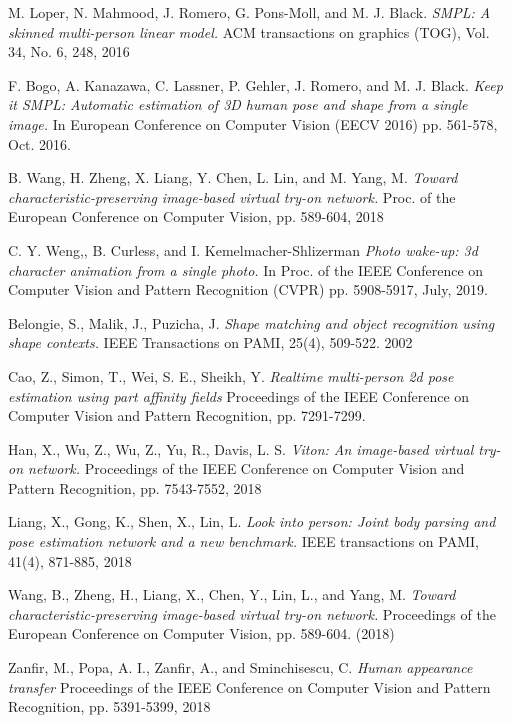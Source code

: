 \documentclass[runningheads]{llncs}
\begin{document}
   

\begin{thebibliography}{9}

M. Loper, N. Mahmood, J. Romero, G. Pons-Moll, and  M. J. Black.
\textit{SMPL: A skinned multi-person linear model.}
ACM transactions on graphics (TOG), Vol. 34, No. 6, 248, 2016

F. Bogo, A. Kanazawa, C. Lassner, P. Gehler, J. Romero, and M. J. Black.
\textit{Keep it SMPL: Automatic estimation of 3D human pose and shape from a single image.}
In European Conference on Computer Vision (EECV 2016) pp. 561-578, Oct. 2016.


B. Wang, H. Zheng, X. Liang, Y. Chen, L. Lin, and M. Yang, M.
\textit{Toward characteristic-preserving image-based virtual try-on network.}
Proc. of the European Conference on Computer Vision, pp. 589-604, 2018

C. Y. Weng,, B. Curless, and I. Kemelmacher-Shlizerman
\textit{Photo wake-up: 3d character animation from a single photo.}
In Proc. of the IEEE Conference on Computer Vision and Pattern Recognition (CVPR) pp. 5908-5917, July, 2019.


Belongie, S., Malik, J.,  Puzicha, J. 
\textit{Shape matching and object recognition using shape contexts.}
IEEE Transactions on PAMI, 25(4), 509-522. 2002

Cao, Z., Simon, T., Wei, S. E.,  Sheikh, Y. 
\textit{Realtime multi-person 2d pose estimation using part affinity fields}
Proceedings of the IEEE Conference on Computer Vision and Pattern Recognition, pp. 7291-7299.

Han, X., Wu, Z., Wu, Z., Yu, R., Davis, L. S.
\textit{Viton: An image-based virtual try-on network.}
Proceedings of the IEEE Conference on Computer Vision and Pattern Recognition, pp. 7543-7552, 2018

Liang, X., Gong, K., Shen, X., Lin, L. 
\textit{Look into person: Joint body parsing and pose estimation network and a new benchmark.}
IEEE transactions on PAMI, 41(4), 871-885, 2018


Wang, B., Zheng, H., Liang, X., Chen, Y., Lin, L., and Yang, M. 
\textit{Toward characteristic-preserving image-based virtual try-on network.} Proceedings of the European Conference on Computer Vision, pp. 589-604. (2018)


Zanfir, M., Popa, A. I., Zanfir, A., and Sminchisescu, C. 
\textit{Human appearance transfer}
Proceedings of the IEEE Conference on Computer Vision and Pattern Recognition, pp. 5391-5399, 2018




\end{thebibliography}
\end{document}
